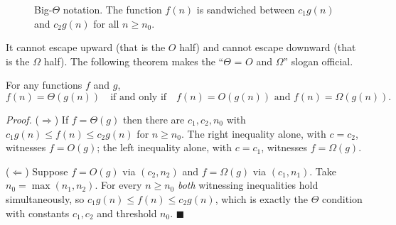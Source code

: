 \begin{figure}[htbp]
\centering
{}
\caption{Big-$\Theta$ notation. The function $f(n)$ is sandwiched between $c_1 g(n)$ and $c_2 g(n)$ for all $n \ge n_0$.}
\label{ch03:fig-bigtheta}
\end{figure}

It cannot escape upward (that is the $O$ half)
and cannot escape downward (that is the $\Omega$ half). The following theorem makes the
``$\Theta$ = $O$ and $\Omega$'' slogan official.

\begin{formalbox}
\begin{theorem}\label{ch03:thm-theta-split}
For any functions $f$ and $g$,
\[
  f(n) = \Theta(g(n)) \quad\text{if and only if}\quad f(n) = O(g(n)) \text{ and } f(n) = \Omega(g(n)).
\]
\end{theorem}
\end{formalbox}

\begin{formalbox}
\emph{Proof.} ($\Rightarrow$) If $f = \Theta(g)$ then there are $c_1,c_2,n_0$ with
$c_1 g(n) \le f(n) \le c_2 g(n)$ for $n\ge n_0$. The right inequality alone, with
$c = c_2$, witnesses $f = O(g)$; the left inequality alone, with $c = c_1$, witnesses
$f = \Omega(g)$.

($\Leftarrow$) Suppose $f = O(g)$ via $(c_2, n_2)$ and $f = \Omega(g)$ via $(c_1, n_1)$.
Take $n_0 = \max(n_1, n_2)$. For every $n \ge n_0$ \emph{both} witnessing inequalities
hold simultaneously, so $c_1 g(n) \le f(n) \le c_2 g(n)$, which is exactly the
$\Theta$ condition with constants $c_1, c_2$ and threshold $n_0$. \hfill$\blacksquare$
\end{formalbox}

